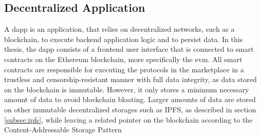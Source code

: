             

\subsection{Decentralized Application}

A \acrfull{dapp} is an application, that relies on decentralized networks, such as a blockchain, to execute backend application logic and to persist data. In this thesis, the \acrshort{dapp} consists of a frontend user interface that is connected to smart contracts on the Ethereum blockchain, more specifically the \acrshort{evm}. All smart contracts are responsible for executing the protocols in the marketplace in a trustless and censorship-resistant manner with full data integrity, as data stored on the blockchain is immutable. However, it only stores a minimum necessary amount of data to avoid blockchain bloating. Larger amounts of data are stored on other immutable decentralized storages such as IPFS, as described in section \ref{subsec:ipfs}, while leaving a related pointer on the blockchain according to the Content-Addressable Storage Pattern \cite{eberhardtBlockchainInsightsOffChaining2017}

